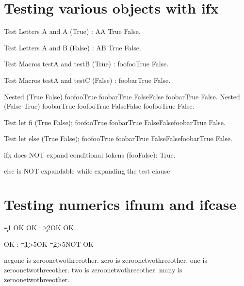 \documentclass{article}
\begin{document}
\section{Testing various objects with ifx}
\def\testA{foo}
\def\testB{foo}
\def\testC{bar}

Test Letters A and A (True) : \ifx AA True \else False\fi.

Test Letters A and B (False) : \ifx AB True \else False\fi.

Test Macros testA and testB (True) : \ifx\testA\testB True \else False\fi.

Test Macros testA and testC (False) : \ifx\testA\testC True \else False\fi.

Nested (True False)
\ifx\testA\testB True \ifx\testA\testC True \else False\fi \else False \ifx\testA\testC True \else False\fi\fi.
Nested (False True)
\ifx\testA\testC True \ifx\testA\testB True \else False\fi \else False \ifx\testA\testB True \else False\fi\fi.

\let\endif\fi
Test let fi (True False); 
\ifx\testA\testB True \ifx\testA\testC True \else False\endif \else False\ifx\testA\testC True \else False\endif\endif.

\let\otherwise\else
Test let else (True False); 
\ifx\testA\testB True \ifx\testA\testC True \otherwise False\endif \otherwise False\ifx\testA\testC True \otherwise False\endif\endif.


ifx does NOT expand conditional tokens (fooFalse): \ifx\iftrue\testA True\else\testB False\fi.

else is NOT expandable while expanding the test clause

\section{Testing numerics ifnum and ifcase}
\newcount\c\c=1
OK OK :
\ifnum\c>2\else OK \fi
{}\else OK\fi.

\def\oneorten{1\ifodd\c{}\fi}
OK :
\c=1\relax\ifnum\oneorten>5\else OK \fi
\c=2\relax\ifnum\oneorten>5\else NOT OK\fi


\newcount\negone{}\relax
\newcount\zero{}\relax
\newcount\one{}\relax
\newcount\two{}\relax
\newcount\many{}\relax
negone is \ifcase\negone zero\or one\or two\or three\else other\fi.
zero is \ifcase\zero zero\or one\or two\or three\else other\fi.
one is \ifcase\one zero\or one\or two\or three\else other\fi.
two is \ifcase\two zero\or one\or two\or three\else other\fi.
many is \ifcase\many zero\or one\or two\or three\else other\fi.
\end{document}
